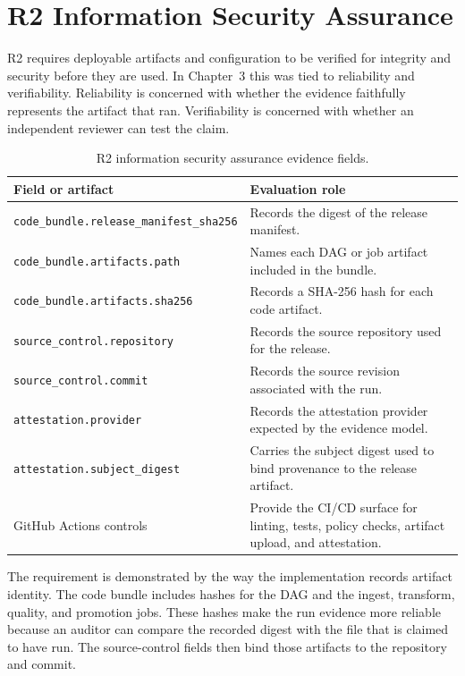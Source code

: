 \section{R2 Information Security Assurance}
\noindent
R2 requires deployable artifacts and configuration to be verified for integrity
and security before they are used. In Chapter~3 this was tied to reliability
and verifiability. Reliability is concerned with whether the evidence faithfully
represents the artifact that ran. Verifiability is concerned with whether an
independent reviewer can test the claim.

\begin{table}[H]
  \centering
  \caption{R2 information security assurance evidence fields.}
  \label{tab:evaluation-r2-fields}
  \renewcommand{\arraystretch}{1.15}
  \begin{tabularx}{\textwidth}{@{}p{}X@{}}
    \toprule
    \textbf{Field or artifact} & \textbf{Evaluation role} \\
    \midrule
    \texttt{code\_bundle.release\_manifest\_sha256} & Records the digest of the release manifest. \\
    \texttt{code\_bundle.artifacts.path} & Names each DAG or job artifact included in the bundle. \\
    \texttt{code\_bundle.artifacts.sha256} & Records a SHA-256 hash for each code artifact. \\
    \texttt{source\_control.repository} & Records the source repository used for the release. \\
    \texttt{source\_control.commit} & Records the source revision associated with the run. \\
    \texttt{attestation.provider} & Records the attestation provider expected by the evidence model. \\
    \texttt{attestation.subject\_digest} & Carries the subject digest used to bind provenance to the release artifact. \\
    GitHub Actions controls & Provide the CI/CD surface for linting, tests, policy checks, artifact upload, and attestation. \\
    \bottomrule
  \end{tabularx}
\end{table}

The requirement is demonstrated by the way the implementation records artifact
identity. The code bundle includes hashes for the DAG and the ingest,
transform, quality, and promotion jobs. These hashes make the run evidence more
reliable because an auditor can compare the recorded digest with the file that
is claimed to have run. The source-control fields then bind those artifacts to
the repository and commit.

